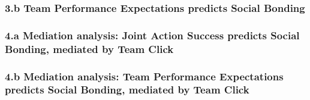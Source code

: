 {\subsubsection{3.b Team Performance Expectations predicts Social Bonding} %
\subsubsection{4.a Mediation analysis: Joint Action Success predicts Social Bonding, mediated by Team Click}
\subsubsection{4.b Mediation analysis: Team Performance Expectations predicts Social Bonding, mediated by Team Click}




}
